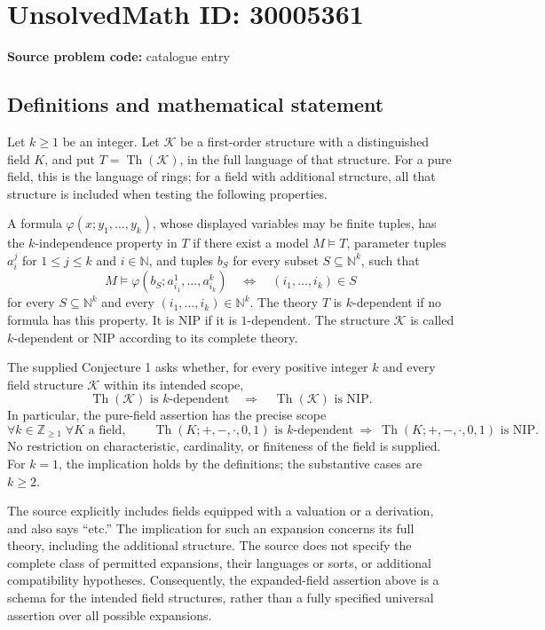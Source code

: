 \documentclass[11pt]{article}
\newcommand{\N}{\mathbb{N}}
\newcommand{\Z}{\mathbb{Z}}
\begin{document}
\section*{UnsolvedMath ID: 30005361}
\textbf{Source problem code:} catalogue entry
\subsection{Definitions and mathematical statement}
Let \(k\geq 1\) be an integer. Let \(\mathcal K\) be a first-order structure with a distinguished field \(K\), and put \(T=\operatorname{Th}(\mathcal K)\), in the full language of that structure. For a pure field, this is the language of rings; for a field with additional structure, all that structure is included when testing the following properties.

A formula \(\varphi(x;y_1,\ldots,y_k)\), whose displayed variables may be finite tuples, has the \(k\)-independence property in \(T\) if there exist a model \(M\models T\), parameter tuples \(a_i^j\) for \(1\leq j\leq k\) and \(i\in\N\), and tuples \(b_S\) for every subset \(S\subseteq\N^k\), such that
\[
M\models\varphi(b_S;a_{i_1}^1,\ldots,a_{i_k}^k)
\quad\Longleftrightarrow\quad
(i_1,\ldots,i_k)\in S
\]
for every \(S\subseteq\N^k\) and every \((i_1,\ldots,i_k)\in\N^k\). The theory \(T\) is \(k\)-dependent if no formula has this property. It is \(\mathrm{NIP}\) if it is \(1\)-dependent. The structure \(\mathcal K\) is called \(k\)-dependent or \(\mathrm{NIP}\) according to its complete theory.

The supplied Conjecture 1 asks whether, for every positive integer \(k\) and every field structure \(\mathcal K\) within its intended scope,
\[
\operatorname{Th}(\mathcal K)\text{ is }k\text{-dependent}
\quad\Longrightarrow\quad
\operatorname{Th}(\mathcal K)\text{ is }\mathrm{NIP}.
\]
In particular, the pure-field assertion has the precise scope
\[
\forall k\in\Z_{\geq1}\;\forall K\text{ a field},\qquad
\operatorname{Th}(K;+,-,\cdot,0,1)\text{ is }k\text{-dependent}
\ \Longrightarrow\ 
\operatorname{Th}(K;+,-,\cdot,0,1)\text{ is }\mathrm{NIP}.
\]
No restriction on characteristic, cardinality, or finiteness of the field is supplied. For \(k=1\), the implication holds by the definitions; the substantive cases are \(k\geq2\).

The source explicitly includes fields equipped with a valuation or a derivation, and also says ``etc.'' The implication for such an expansion concerns its full theory, including the additional structure. The source does not specify the complete class of permitted expansions, their languages or sorts, or additional compatibility hypotheses. Consequently, the expanded-field assertion above is a schema for the intended field structures, rather than a fully specified universal assertion over all possible expansions.
\end{document}
